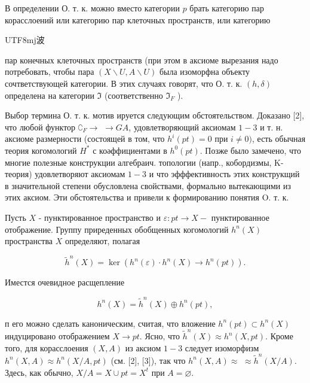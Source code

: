 \documentclass[10pt]{article}
\begin{document}
В определении О. т. к. можно вместо категории $p$ брать категорию пар корасслоений или категорию пар клеточных пространств, или категорию \begin{CJK}{UTF8}{mj}波\end{CJK} пар конечных клеточных пространств (при этом в аксиоме вырезания надо потребовать, чтобы пара $(X \backslash U, A \backslash U)$ была изоморфна объекту сочтветствующей категории. В этих случаях говорят, что О. т. к. $(h, \delta)$ определена на категории $\Im$ (соответственно $\Im_{F}$ ).



Выбор термина О. т. к. мотив ируется следующим обстоятельством. Доказано [2], что любой функтор $\complement_{F} \rightarrow$ $\rightarrow G A$, удовлетворяющий аксиомам $1-3$ и т. н. аксиоме размерности (состоящей в том, что $h^{i}(p t)=0$ при $i \neq 0)$, есть обычная теория когомологий $H^{*}$ с коәффициентами в $h^{0}(p t)$. Позже было замечено, что многие полезные конструкции алгебраич. топологии (напр., кобордизмы, K-теория) удовлетворяют аксиомам $1-3$ и что эфффективность этих конструкщий в значительной степени обусловлена свойствами, формально вытекающими из этих аксиом. Эти обстоятельства и привели к формированию понятия $\mathrm{O}$. т. к.



Пусть $X$ - пунктированное пространство и $\varepsilon: p t \rightarrow X-$ пунктированное отображение. Группу приреденных обобщенных когомологий $h^{n}(X)$ пространства $X$ определяют, полагая



\[

\tilde{h}^{n}(X)=\operatorname{ker}\left(h^{n}(\varepsilon) \cdot h^{n}(X) \rightarrow h^{n}(p t)\right) .

\]



Иместся очевидное расщепление



\[

h^{n}(X)=\tilde{h}^{n}(X) \oplus h^{n}(p t),

\]



п его можно сделать каноническим, считая, что вложение $h^{n}(p t) \subset h^{n}(X)$ индуцировано отображением $X \rightarrow p t$. Ясно, что $\tilde{h}^{n}(X) \approx h^{n}(X, p t)$. Кроме того, для корасслоения $(X, A)$ из аксиом $1-3$ следует изоморфизм $h^{n}(X, A) \approx h^{n}(X / A, p t)$ (см. [2], [3]), так что $h^{n}(X, A) \approx$ $\approx \tilde{h}^{n}(X / A)$. Здесь, как обычно, $X / A=X \cup p t=X^{t}$ при $A=\varnothing$.
\end{document}
